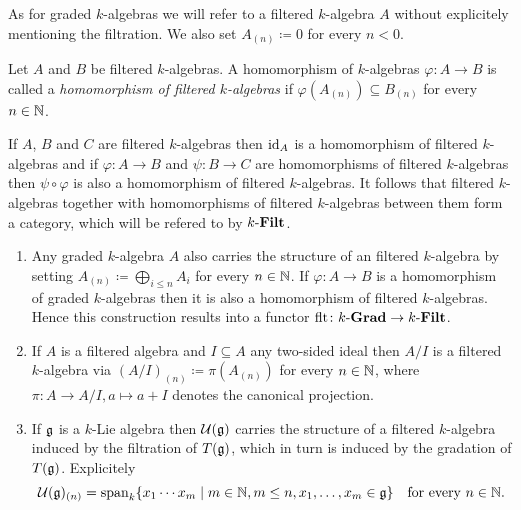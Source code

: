 \begin{rem}
 As for graded $k$-algebras we will refer to a filtered $k$-algebra $A$ without explicitely mentioning the filtration. We also set $A_{(n)} \coloneqq 0$ for every $n < 0$.
\end{rem}


\begin{defi}
 Let $A$ and $B$ be filtered $k$-algebras. A homomorphism of $k$-algebras $\varphi \colon A \to B$ is called a \emph{homomorphism of filtered $k$-algebras} if $\varphi(A_{(n)}) \subseteq B_{(n)}$ for every $n \in \mathbb{N}$.
\end{defi}


\begin{rem}
 If $A$, $B$ and $C$ are filtered $k$-algebras then $\operatorname{id}_A$ is a homomorphism of filtered $k$-algebras and if $\varphi \colon A \to B$ and $\psi \colon B \to C$ are homomorphisms of filtered $k$-algebras then $\psi \circ \varphi$ is also a homomorphism of filtered $k$-algebras. It follows that filtered $k$-algebras together with homomorphisms of filtered $k$-algebras between them form a category, which will be refered to by $k\text{-}\mathbf{Filt}$.
\end{rem}


\begin{expls}
 \begin{enumerate}[leftmargin=*]
  \item
   Any graded $k$-algebra $A$ also carries the structure of an filtered $k$-algebra by setting $A_{(n)} \coloneqq \bigoplus_{i \leq n} A_i$ for every $n \in \mathbb{N}$. If $\varphi \colon A \to B$ is a homomorphism of graded $k$-algebras then it is also a homomorphism of filtered $k$-algebras. Hence this construction results into a functor $\operatorname{flt} \colon k\text{-}\mathbf{Grad} \to k\text{-}\mathbf{Filt}$.
  \item 
   If $A$ is a filtered algebra and $I \subseteq A$ any two-sided ideal then $A/I$ is a filtered $k$-algebra via $(A/I)_{(n)} \coloneqq \pi(A_{(n)})$ for every $n \in \mathbb{N}$, where $\pi \colon A \to A/I, a \mapsto a + I$ denotes the canonical projection.
  \item
   If $\mathfrak{g}$ is a $k$-Lie algebra then $\mathcal{U}(\mathfrak{g})$ carries the structure of a filtered $k$-algebra induced by the filtration of $T(\mathfrak{g})$, which in turn is induced by the gradation of $T(\mathfrak{g})$. Explicitely
   \[
   \mathcal{U}(\mathfrak{g})_{(n)}
   = \operatorname{span}_k \{x_1 \dotsm x_m \mid m \in \mathbb{N}, m \leq n, x_1, \dotsc, x_m \in \mathfrak{g}\}
   \quad\text{for every $n \in \mathbb{N}$}.
   \]
 \end{enumerate}
\end{expls}


